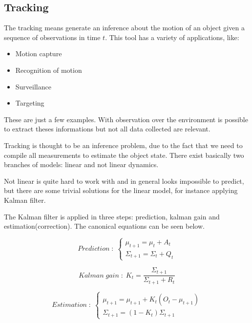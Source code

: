 \documentclass{article}
\begin{document}
\subsection{Tracking}

The tracking means generate an inference about the motion of an object given a sequence of observations in time $t$. This tool has a variety of applications, like:

\begin{itemize}
\item Motion capture
\item Recognition of motion
\item Surveillance
\item Targeting
\end{itemize}

These are just a few examples. With observation over the environment is possible to extract theses informations but not all data collected are relevant. 

Tracking is thought to be an inference problem, due to the fact that we need to compile all measurements to estimate the object state. There exist basically two branches of models: linear and not linear dynamics.

Not linear is quite hard to work with and in general looks impossible to predict, but there are some trivial solutions for the  linear model, for instance applying Kalman filter.

The Kalman filter is applied in three steps: prediction, kalman gain and estimation(correction). The canonical equations can be seen below.

\begin{equation} \label{eq:prediction}
  Prediction\;:\; 
  \left\{ 
    \begin{array}{ c }
      \mu_{t+1} = \mu_t + A_t \\
      \Sigma_{t+1} = \Sigma_t + Q_t
    \end{array}
  \right.
\end{equation}

\begin{equation} \label{eq:kalman_gain}
  Kalman\;gain\;:\; K_t = \frac{\Sigma_{t+1}}{\Sigma_{t+1} + R_t}
\end{equation}

\begin{equation} \label{eq:estimation}
  Estimation\;:\; 
  \left\{ 
    \begin{array}{ c }
      \mu_{t+1} = \mu_{t+1} + K_t(O_t - \mu_{t+1}) \\
      \Sigma_{t+1} = (1 - K_t)\Sigma_{t+1}
    \end{array}
  \right.
\end{equation}
\end{document}
